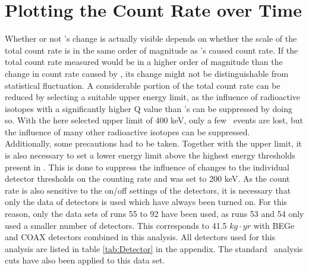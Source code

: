 \documentclass[encoding=utf8,british]{tumphthesis}
\begin{document}
\section{Plotting the Count Rate over Time}
\label{sec:plotting}

Whether or not \Kr's change is actually visible depends on whether the scale of the total count rate is in the same order of magnitude as \Kr's caused count rate.
If the total count rate measured would be in a higher order of magnitude than the change in count rate caused by \Kr, its change might not be distinguishable from statistical fluctuation.
A considerable portion of the total count rate can be reduced by selecting a suitable upper energy limit, as the influence of radioactive isotopes with a significantly higher Q value than \Kr's can be suppressed by doing so.
With the here selected upper limit of 400 keV, only a few \Kr\ events are lost, but the influence of many other radioactive isotopes can be suppressed.
\\

Additionally, some precautions had to be taken.
Together with the upper limit, it is also necessary to set a lower energy limit above the highest energy thresholds present in \PII.
This is done to suppress the influence of changes to the individual detector thresholds on the counting rate and was set to 200 keV.
As the count rate is also sensitive to the on/off settings of the detectors, it is necessary that only the data of detectors is used which have always been turned on.
For this reason, only the data sets of runs 55 to 92 have been used, as runs 53 and 54 only used a smaller number of detectors.
This corresponds to 41.5 $\unit{kg}\cdot\unit{yr}$ with BEGe and COAX detectors combined in this analysis.
All detectors used for this analysis are listed in table \ref{tab:Detector} in the appendix.
The standard \gerda\ analysis cuts have also been applied to this data set.
\\
\end{document}
